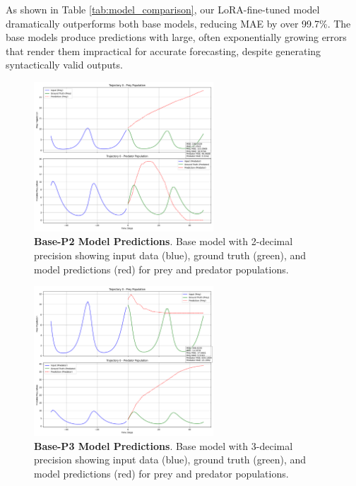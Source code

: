 \documentclass{article}
\begin{document}
As shown in Table \ref{tab:model_comparison}, our LoRA-fine-tuned model dramatically outperforms both base models, reducing MAE by over 99.7\%. The base models produce predictions with large, often exponentially growing errors that render them impractical for accurate forecasting, despite generating syntactically valid outputs.

\begin{figure}[H]
    \centering
    \includegraphics[width=0.6\textwidth]{trajectory_0_prediction_p2}
    \caption{\textbf{Base-P2 Model Predictions}. Base model with 2-decimal precision showing input data (blue), ground truth (green), and model predictions (red) for prey and predator populations.}
    \label{fig:base_p2_predictions_sample}
\end{figure}

\begin{figure}[H]
    \centering
    \includegraphics[width=0.6\textwidth]{trajectory_0_prediction_p3}
    \caption{\textbf{Base-P3 Model Predictions}. Base model with 3-decimal precision showing input data (blue), ground truth (green), and model predictions (red) for prey and predator populations.}
    \label{fig:base_p3_predictions_sample}
\end{figure}
\end{document}
